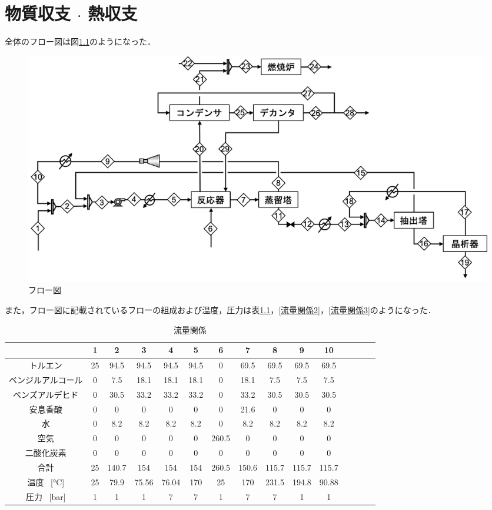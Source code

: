 \documentclass[a4j]{jsreport}
\begin{document}
\newpage
\chapter{物質収支 $\cdot$ 熱収支}
全体のフロー図は図\ref{フロー図}のようになった．
\begin{figure}[htbp]
  \centering
  \includegraphics[scale=0.6]{mat_flow.png}
  \caption{フロー図}
  \label{フロー図}
\end{figure}

また，フロー図に記載されているフローの組成および温度，圧力は表\ref{流量関係1}，\ref{流量関係2}，\ref{流量関係3}のようになった．
\begin{table}[htbp]
  \centering
  \caption{流量関係}
  \label{流量関係1}
  \begin{tabular}{ccccccccccccccc}
    \hline
    [\si{\kilo \mole \per \hour}] & 1 & 2 & 3 & 4 & 5 & 6 & 7 & 8 & 9 & 10 \\
    \hline
    トルエン & 25 & 94.5 & 94.5 & 94.5 & 94.5 & 0 & 69.5 & 69.5 & 69.5 & 69.5 \\
    ベンジルアルコール & 0 & 7.5 & 18.1 & 18.1 & 18.1 & 0 & 18.1 & 7.5 & 7.5 & 7.5 \\
    ベンズアルデヒド & 0 & 30.5 & 33.2 & 33.2 & 33.2 & 0 & 33.2 & 30.5 & 30.5 & 30.5 \\
    安息香酸 & 0 & 0 & 0 & 0 & 0 & 0 & 21.6 & 0 & 0 & 0 \\
    水 & 0 & 8.2 & 8.2 & 8.2 & 8.2 & 0 & 8.2 & 8.2 & 8.2 & 8.2 \\
    空気 & 0 & 0 & 0 & 0 & 0 & 260.5 & 0 & 0 & 0 & 0 \\
    二酸化炭素 & 0 & 0 & 0 & 0 & 0 & 0 & 0 & 0 & 0 & 0 \\
    \hline
    合計 & 25 & 140.7 & 154 & 154 & 154 & 260.5 & 150.6 & 115.7 & 115.7 & 115.7 \\
    \hline
    温度 \, [\si{\degreeCelsius}] & 25 & 79.9 & 75.56 & 76.04 & 170 & 25 & 170 & 231.5 & 194.8 & 90.88 \\
    圧力 \, [\si{\bar}] & 1 & 1 & 1 & 7 & 7 & 1 & 7 & 7 & 1 & 1 \\
    \hline
  \end{tabular}
\end{table}
\end{document}
